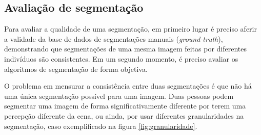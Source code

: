 \subsection{Avaliação de segmentação}\label{sec:avaliacaopdi}

Para avaliar a qualidade de uma segmentação, em primeiro lugar é preciso aferir a validade da base de dados de segmentações manuais (\textit{ground-truth}), demonstrando que segmentações de uma mesma imagem feitas por diferentes indivíduos são consistentes. Em um segundo momento, é preciso avaliar os algoritmos de segmentação de forma objetiva.

O problema em mensurar a consistência entre duas segmentações é que não há uma única segmentação possível para uma imagem. Duas pessoas podem segmentar uma imagem de forma significativamente diferente por terem uma percepção diferente da cena, ou ainda, por usar diferentes granularidades na segmentação, caso exemplificado na figura \ref{fig:granularidade}.

